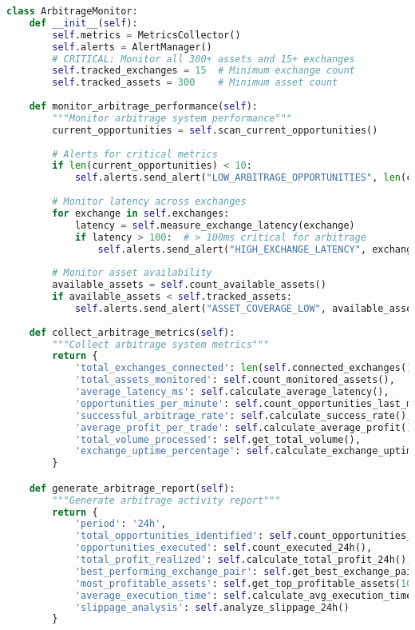 \documentclass[12pt,a4paper]{article}
\begin{document}

\begin{lstlisting}[language=Python, caption=Arbitrage Monitoring System]
class ArbitrageMonitor:
    def __init__(self):
        self.metrics = MetricsCollector()
        self.alerts = AlertManager()
        # CRITICAL: Monitor all 300+ assets and 15+ exchanges
        self.tracked_exchanges = 15  # Minimum exchange count
        self.tracked_assets = 300    # Minimum asset count
    
    def monitor_arbitrage_performance(self):
        """Monitor arbitrage system performance"""
        current_opportunities = self.scan_current_opportunities()
        
        # Alerts for critical metrics
        if len(current_opportunities) < 10:
            self.alerts.send_alert("LOW_ARBITRAGE_OPPORTUNITIES", len(current_opportunities))
        
        # Monitor latency across exchanges
        for exchange in self.exchanges:
            latency = self.measure_exchange_latency(exchange)
            if latency > 100:  # > 100ms critical for arbitrage
                self.alerts.send_alert("HIGH_EXCHANGE_LATENCY", exchange, latency)
        
        # Monitor asset availability
        available_assets = self.count_available_assets()
        if available_assets < self.tracked_assets:
            self.alerts.send_alert("ASSET_COVERAGE_LOW", available_assets)
    
    def collect_arbitrage_metrics(self):
        """Collect arbitrage system metrics"""
        return {
            'total_exchanges_connected': len(self.connected_exchanges()),
            'total_assets_monitored': self.count_monitored_assets(),
            'average_latency_ms': self.calculate_average_latency(),
            'opportunities_per_minute': self.count_opportunities_last_minute(),
            'successful_arbitrage_rate': self.calculate_success_rate(),
            'average_profit_per_trade': self.calculate_average_profit(),
            'total_volume_processed': self.get_total_volume(),
            'exchange_uptime_percentage': self.calculate_exchange_uptime()
        }

    def generate_arbitrage_report(self):
        """Generate arbitrage activity report"""
        return {
            'period': '24h',
            'total_opportunities_identified': self.count_opportunities_24h(),
            'opportunities_executed': self.count_executed_24h(),
            'total_profit_realized': self.calculate_total_profit_24h(),
            'best_performing_exchange_pair': self.get_best_exchange_pair(),
            'most_profitable_assets': self.get_top_profitable_assets(10),
            'average_execution_time': self.calculate_avg_execution_time(),
            'slippage_analysis': self.analyze_slippage_24h()
        }


\end{lstlisting}
\end{document}
